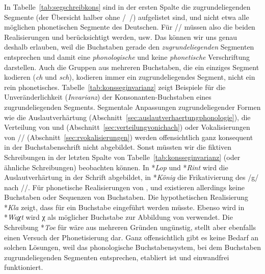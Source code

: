 In Tabelle~\ref{tab:segschreibkons} sind in der ersten Spalte die zugrundeliegenden Segmente (der Übersicht halber ohne /~/) aufgelistet sind, und nicht etwa alle möglichen phonetischen Segmente des Deutschen.
Für // müssen also die beiden Realisierungen \textipa{[\c{c}]} und \textipa{[X]} berücksichtigt werden, usw.
Das können wir uns genau deshalb erlauben, weil die Buchstaben gerade den \textit{zugrundeliegenden} Segmenten entsprechen und damit eine \textit{phonologische} und keine \textit{phonetische} Verschriftung darstellen.
Auch die Gruppen aus mehreren Buchstaben, die ein einziges Segment kodieren (\zB \textit{ch} und \textit{sch}), kodieren immer ein zugrundeliegendes Segment, nicht ein rein phonetisches. 
Tabelle~\ref{tab:konsseginvarianz} zeigt Beispiele für die Unveränderlichkeit (\textit{Invarianz}) der Konsonanten-Buchstaben eines zugrundeliegenden Segments.
Segmentale Anpassungen zugrundeliegender Formen wie die Auslautverhärtung (Abschnitt~\ref{sec:auslautverhaertungphonologie}), die Verteilung von \textipa{[\c{c}]} und \textipa{[X]} (Abschnitt~\ref{sec:verteilungvonichach}) oder Vokalisierungen von // (Abschnitt~\ref{sec:rvokalisierungen}) werden offensichtlich ganz konsequent in der Buchstabenschrift nicht abgebildet.
Sonst müssten wir die fiktiven Schreibungen in der letzten Spalte von Tabelle~\ref{tab:konsseginvarianz} (oder ähnliche Schreibungen) beobachten können.
In *\textit{Lop} und *\textit{Rint} wird die Auslautverhärtung in der Schrift abgebildet, in *\textit{König} die Frikativierung des /g/ nach //. 
Für phonetische Realisierungen von \textipa{[N]}, \textipa{[X]} und \textipa{[5]} existieren allerdings keine Buchstaben oder Sequenzen von Buchstaben.
Die hypothetischen Realisierung *\textit{Kla} zeigt, dass für \textipa{[N]} ein Buchstabe eingeführt werden müsste.
Ebenso wird in *\textit{Waχt} wird χ als möglicher Buchstabe zur Abbildung von \textipa{[X]} verwendet.
Die Schreibung *\textit{Toe} für \textipa{[t\t{o5}]} wäre aus mehreren Gründen ungünstig, stellt aber ebenfalls einen Versuch der Phonetisierung dar.
Ganz offensichtlich gibt es keine Bedarf an solchen Lösungen, weil das phonologische Buchstabensystem, bei dem Buchstaben zugrundeliegenden Segmenten entsprechen, etabliert ist und einwandfrei funktioniert.

